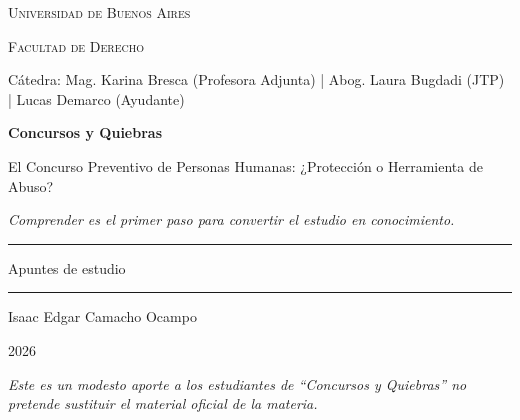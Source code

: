 \documentclass[12pt,oneside]{book}
\newcommand{\universidad}{Universidad de Buenos Aires}
\newcommand{\facultad}{Facultad de Derecho}
\newcommand{\materia}{Concursos y Quiebras}
\newcommand{\titulo}{El Concurso Preventivo de Personas Humanas: ¿Protección o Herramienta de Abuso?}
\newcommand{\catedra}{Cátedra: Mag. Karina Bresca (Profesora Adjunta) | Abog. Laura Bugdadi (JTP) | Lucas Demarco (Ayudante)}
\newcommand{\autor}{Isaac Edgar Camacho Ocampo}
\newcommand{\anio}{2026}
\begin{document}
\begin{titlepage}

\thispagestyle{empty}

\begin{center}

\vspace*{1cm}

{\large \textsc{\universidad}}

\vspace{0.2cm}

{\large \textsc{\facultad}}

\vspace{0.3cm}

{\small \catedra}

\vspace{2.5cm}

{\Huge \textbf{\materia}}

\vspace{1cm}

{\Large \titulo}

\vspace{0.8cm}

\textit{Comprender es el primer paso para convertir el estudio en conocimiento.}

\vspace{1.2cm}

\rule{0.70\textwidth}{0.5pt}

\vspace{0.5cm}

{\large Apuntes de estudio}

\vspace{0.5cm}

\rule{0.70\textwidth}{0.5pt}

\vfill

{\large \autor}

\vspace{0.3cm}

{\large \anio}

\end{center}

\vfill

\begin{flushleft}
\textit{Este es un modesto aporte a los estudiantes de ``Concursos y Quiebras'' no pretende sustituir el material oficial de la materia.}
\end{flushleft}

\end{titlepage}
\end{document}

